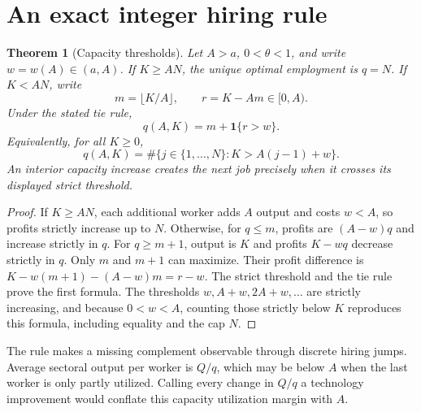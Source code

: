 \documentclass[11pt,a4paper]{article}
\newtheorem{theorem}{Theorem}[section]
\theoremstyle{definition}
\theoremstyle{remark}
\newcommand{\ind}{\mathbf 1}
\begin{document}
\section{An exact integer hiring rule}
\begin{theorem}[Capacity thresholds]\label{th:hiring}
Let $A>a$, $0<\theta<1$, and write $w=w(A)\in(a,A)$. If $K\geq AN$, the unique optimal employment is $q=N$. If $K<AN$, write
\[
 m=\lfloor K/A\rfloor,\qquad r=K-Am\in[0,A).
\]
Under the stated tie rule,
\[
 q(A,K)=m+\ind\{r>w\}.
\]
Equivalently, for all $K\geq0$,
\begin{equation}\label{eq:threshold}
 q(A,K)=\#\{j\in\{1,\ldots,N\}:K>A(j-1)+w\}.
\end{equation}
An interior capacity increase creates the next job precisely when it crosses its displayed strict threshold.
\end{theorem}
\begin{proof}
If $K\geq AN$, each additional worker adds $A$ output and costs $w<A$, so profits strictly increase up to $N$. Otherwise, for $q\leq m$, profits are $(A-w)q$ and increase strictly in $q$. For $q\geq m+1$, output is $K$ and profits $K-wq$ decrease strictly in $q$. Only $m$ and $m+1$ can maximize. Their profit difference is $K-w(m+1)-(A-w)m=r-w$. The strict threshold and the tie rule prove the first formula. The thresholds $w,A+w,2A+w,\ldots$ are strictly increasing, and because $0<w<A$, counting those strictly below $K$ reproduces this formula, including equality and the cap $N$.
\end{proof}

The rule makes a missing complement observable through discrete hiring jumps. Average sectoral output per worker is $Q/q$, which may be below $A$ when the last worker is only partly utilized. Calling every change in $Q/q$ a technology improvement would conflate this capacity utilization margin with $A$.
\end{document}
